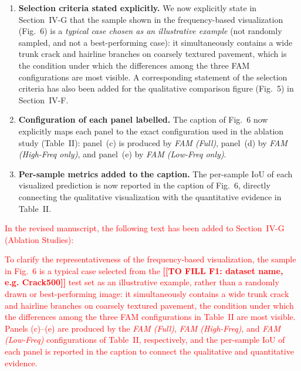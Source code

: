\documentclass[lettersize,journal,onecolumn,12pt]{IEEEtran}
\newcommand{\FILLIN}[1]{\textcolor{fillorange}{\textbf{[[TO FILL #1]]}}}
\begin{document}
\begin{enumerate}
    \item \textbf{Selection criteria stated explicitly.}
    We now explicitly state in Section~IV-G that the sample shown in the frequency-based visualization (Fig.~6) is a
    \emph{typical case chosen as an illustrative example} (not randomly sampled, and not a best-performing case):
    it simultaneously contains a wide trunk crack and hairline branches on coarsely textured pavement, which is the
    condition under which the differences among the three FAM configurations are most visible.
    A corresponding statement of the selection criteria has also been added for the qualitative comparison figure
    (Fig.~5) in Section~IV-F.

    \item \textbf{Configuration of each panel labelled.}
    The caption of Fig.~6 now explicitly maps each panel to the exact configuration used in the ablation study
    (Table~II): panel~(c) is produced by \emph{FAM (Full)}, panel~(d) by \emph{FAM (High-Freq only)}, and panel~(e)
    by \emph{FAM (Low-Freq only)}.

    \item \textbf{Per-sample metrics added to the caption.}
    The per-sample IoU of each visualized prediction is now reported in the caption of Fig.~6, directly connecting
    the qualitative visualization with the quantitative evidence in Table~II.
\end{enumerate}

\textcolor{red}{In the revised manuscript, the following text has been added to Section~IV-G (Ablation Studies):}

\textcolor{red}{
To clarify the representativeness of the frequency-based visualization, the sample in Fig.~6
is a typical case selected from the \FILLIN{F1: dataset name, e.g. Crack500} test set as an illustrative example,
rather than a randomly drawn or best-performing image: it simultaneously contains a wide trunk crack and hairline
branches on coarsely textured pavement, the condition under which the differences among the three FAM configurations
in Table~II are most visible. Panels (c)--(e) are produced by the \emph{FAM (Full)}, \emph{FAM (High-Freq)}, and
\emph{FAM (Low-Freq)} configurations of Table~II, respectively, and the per-sample IoU of each panel is reported in
the caption to connect the qualitative and quantitative evidence.
}
\end{document}
